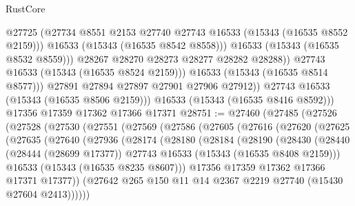\begin{lexlean}{RustCore}
\begin{coremodule}
                        @27725
                        (@27734 @8551 @2153 @27740 @27743 @16533 (@15343 (@16535 @8552 @2159)))
                        @16533
                        (@15343 (@16535 @8542 @8558)))
                      @16533
                      (@15343 (@16535 @8532 @8559)))
                    @28267
                    @28270
                    @28273
                    @28277
                    @28282
                    @28288))
                @27743
                @16533
                (@15343 (@16535 @8524 @2159)))
              @16533
              (@15343 (@16535 @8514 @8577)))
            @27891
            @27894
            @27897
            @27901
            @27906
            @27912))
        @27743
        @16533
        (@15343 (@16535 @8506 @2159)))
      @16533
      (@15343 (@16535 @8416 @8592)))
    @17356
    @17359
    @17362
    @17366
    @17371
@28751 := @27460
    (@27485
      (@27526
        (@27528
          (@27530
            (@27551
              (@27569
                (@27586
                  (@27605
                    (@27616
                      (@27620
                        (@27625
                          (@27635
                            (@27640
                              (@27936
                                (@28174
                                  (@28180
                                    (@28184
                                      (@28190
                                        (@28430
                                          (@28440
                                            (@28444 (@28699 @17377))
                                            @27743
                                            @16533
                                            (@15343 (@16535 @8408 @2159)))
                                          @16533
                                          (@15343 (@16535 @8235 @8607)))
                                        @17356
                                        @17359
                                        @17362
                                        @17366
                                        @17371
                                        @17377))
                                    (@27642
                                      @265
                                      @150
                                      @11
                                      @14
                                      @2367
                                      @2219
                                      @27740
                                      (@15430 @27604 @2413))))))

\end{coremodule}
\end{lexlean}
